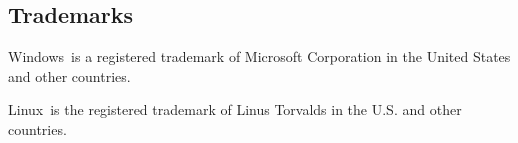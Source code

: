 \documentclass[letterpaper]{article}
\begin{document}
\subsection{Trademarks}
Windows\textregistered\ is a registered trademark of Microsoft Corporation in the United States and other countries.

Linux\textregistered\ is the registered trademark of Linus Torvalds in the U.S. and other countries.

\setlength{\parindent}{0mm}

\vfill \eject
\printindex
\end{document}
